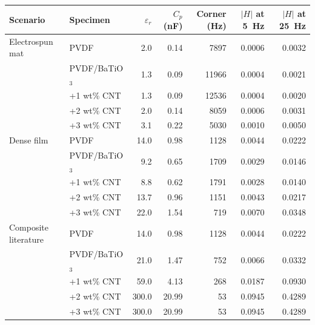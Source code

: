 \begin{tabular}{l l r r r r r}
\toprule
Scenario & Specimen & $\varepsilon_r$ & $C_p$ (\si{\nano\farad}) & Corner (\si{\hertz}) & $|H|$ at \SI{5}{\hertz} & $|H|$ at \SI{25}{\hertz} \\
\midrule
Electrospun mat & PVDF & 2.0 & 0.14 & 7897 & 0.0006 & 0.0032 \\
 & PVDF/BaTiO$_3$ & 1.3 & 0.09 & 11966 & 0.0004 & 0.0021 \\
 & +1 wt\% CNT & 1.3 & 0.09 & 12536 & 0.0004 & 0.0020 \\
 & +2 wt\% CNT & 2.0 & 0.14 & 8059 & 0.0006 & 0.0031 \\
 & +3 wt\% CNT & 3.1 & 0.22 & 5030 & 0.0010 & 0.0050 \\
\midrule
Dense film & PVDF & 14.0 & 0.98 & 1128 & 0.0044 & 0.0222 \\
 & PVDF/BaTiO$_3$ & 9.2 & 0.65 & 1709 & 0.0029 & 0.0146 \\
 & +1 wt\% CNT & 8.8 & 0.62 & 1791 & 0.0028 & 0.0140 \\
 & +2 wt\% CNT & 13.7 & 0.96 & 1151 & 0.0043 & 0.0217 \\
 & +3 wt\% CNT & 22.0 & 1.54 & 719 & 0.0070 & 0.0348 \\
\midrule
Composite literature & PVDF & 14.0 & 0.98 & 1128 & 0.0044 & 0.0222 \\
 & PVDF/BaTiO$_3$ & 21.0 & 1.47 & 752 & 0.0066 & 0.0332 \\
 & +1 wt\% CNT & 59.0 & 4.13 & 268 & 0.0187 & 0.0930 \\
 & +2 wt\% CNT & 300.0 & 20.99 & 53 & 0.0945 & 0.4289 \\
 & +3 wt\% CNT & 300.0 & 20.99 & 53 & 0.0945 & 0.4289 \\
\bottomrule
\end{tabular}
